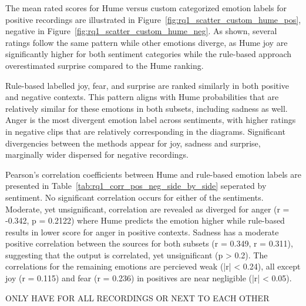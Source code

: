The mean rated scores for Hume versus custom categorized emotion labels for positive recordings are illustrated in 
Figure~\ref{fig:rq1_scatter_custom_hume_pos}, negative in Figure~\ref{fig:rq1_scatter_custom_hume_neg}. As shown, several ratings follow the same 
pattern while other emotions diverge, as Hume joy are significantly higher for both sentiment categories while the rule-based approach overestimated surprise compared to the Hume ranking. 


Rule-based labelled joy, fear, and surprise are ranked similarly in both positive and negative contexts. This pattern aligns with Hume probabilities that are relatively similar for these emotions in both subsets, including sadness as well. 
Anger is the most divergent emotion label across sentiments, with higher ratings in negative clips that are relatively corresponding in the diagrams. Significant divergencies between the methods appear for joy, sadness and surprise, marginally wider dispersed for negative recordings. 


Pearson's correlation coefficients between Hume and rule-based emotion labels are presented in Table~\ref{tab:rq1_corr_pos_neg_side_by_side} seperated by sentiment. 
No significant correlation occurs for either of the sentiments. Moderate, yet unsignificant, correlation are revealed as diverged for anger (r = -0.342, p = 0.2122) where Hume predicts the emotion 
higher while rule-based results in lower score for anger in positive contexts. Sadness has a moderate positive correlation between the sources for both subsets (r = 0.349, r = 0.311), suggesting that the output is correlated, yet unsignificant (p > 0.2). 
The correlations for the remaining emotions are percieved weak (|r| < 0.24), all except joy (r = 0.115) and fear (r = 0.236) in positives are near negligible (|r| < 0.05).  


ONLY HAVE FOR ALL RECORDINGS OR NEXT TO EACH OTHER

